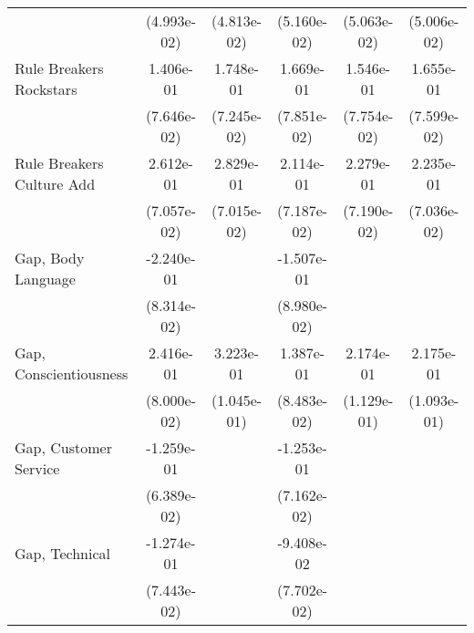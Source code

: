 {\begin{tabular}{l*{5}{c}}
                              & (4.993e-02)           & (4.813e-02)           & (5.160e-02)           & (5.063e-02)           & (5.006e-02)                 \\
    \addlinespace
    Rule Breakers Rockstars   & 1.406e-01\sym{+}      & 1.748e-01\sym{++}     & 1.669e-01\sym{++}     & 1.546e-01\sym{++}     & 1.655e-01\sym{++}           \\
                              & (7.646e-02)           & (7.245e-02)           & (7.851e-02)           & (7.754e-02)           & (7.599e-02)                 \\
    \addlinespace
    Rule Breakers Culture Add & 2.612e-01\sym{**}     & 2.829e-01\sym{**}     & 2.114e-01\sym{*}      & 2.279e-01\sym{*}      & 2.235e-01\sym{*}            \\
                              & (7.057e-02)           & (7.015e-02)           & (7.187e-02)           & (7.190e-02)           & (7.036e-02)                 \\
    \addlinespace
    Gap, Body Language        & -2.240e-01\sym{*}     &                       & -1.507e-01\sym{+}     &                       &                             \\
                              & (8.314e-02)           &                       & (8.980e-02)           &                       &                             \\
    \addlinespace
    Gap, Conscientiousness    & 2.416e-01\sym{*}      & 3.223e-01\sym{*}      & 1.387e-01             & 2.174e-01\sym{+}      & 2.175e-01\sym{++}           \\
                              & (8.000e-02)           & (1.045e-01)           & (8.483e-02)           & (1.129e-01)           & (1.093e-01)                 \\
    \addlinespace
    Gap, Customer Service     & -1.259e-01\sym{+}     &                       & -1.253e-01\sym{+}     &                       &                             \\
                              & (6.389e-02)           &                       & (7.162e-02)           &                       &                             \\
    \addlinespace
    Gap, Technical            & -1.274e-01\sym{+}     &                       & -9.408e-02            &                       &                             \\
                              & (7.443e-02)           &                       & (7.702e-02)           &                       &                             \\

\end{tabular}}

